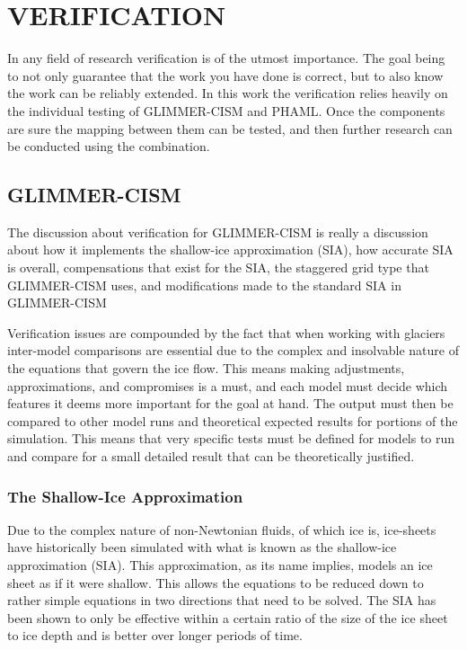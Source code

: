 \chapter{VERIFICATION} \label{ch:verification}


In any field of research verification is of the utmost importance.  The goal being to not only guarantee that the work you have done is correct, but to also know the work can be reliably extended.  In this work the verification relies heavily on the individual testing of GLIMMER-CISM and PHAML.  Once the components are sure the mapping between them can be tested, and then further research can be conducted using the combination.

\section{GLIMMER-CISM}\label{sec:chp5cism}

The discussion about verification for GLIMMER-CISM is really a discussion about how it implements the shallow-ice approximation (SIA), how accurate SIA is overall, compensations that exist for the SIA, the staggered grid type that GLIMMER-CISM uses, and modifications made to the standard SIA in GLIMMER-CISM

Verification issues are compounded by the fact that when working with glaciers inter-model comparisons are essential due to the complex and insolvable nature of the equations that govern the ice flow.  This means making adjustments, approximations, and compromises is a must, and each model must decide which features it deems more important for the goal at hand.  The output must then be compared to other model runs and theoretical expected results for portions of the simulation.  This means that very specific tests must be defined for models to run and compare for a small detailed result that can be theoretically justified.

\subsection{The Shallow-Ice Approximation}

Due to the complex nature of non-Newtonian fluids, of which ice is, ice-sheets have historically been simulated with what is known as the shallow-ice approximation (SIA).  This approximation, as its name implies, models an ice sheet as if it were shallow.  This allows the equations to be reduced down to rather simple equations in two directions that need to be solved.  The SIA has been shown to only be effective within a certain ratio of the size of the ice sheet to ice depth and is better over longer periods of time. %

